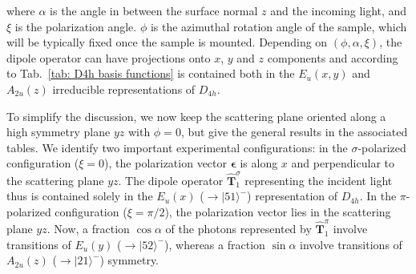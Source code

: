 \documentclass[twocolumn,prb,twocolumn,amsmath,superscriptaddress,nofootinbib,amssymb]{revtex4-1}
\newcommand{\vect}[1]{\boldsymbol{#1}}
\begin{document}
\begin{widetext}
\noindent where $\alpha$ is the angle in between the surface normal $z$ and the incoming light, and $\xi$ is the polarization angle. $\phi$ is the azimuthal rotation angle of the sample, which will be typically fixed once the sample is mounted. Depending on $(\phi,\alpha,\xi)$, the dipole operator can have projections onto $x$, $y$ and $z$ components and according to Tab.~\ref{tab: D4h basis functions} is contained both in the $E_u(x,y)$ and $A_{2u}(z)$ irreducible representations of $D_{4h}$.

To simplify the discussion, we now keep the scattering plane oriented along a high symmetry plane $yz$ with $\phi=0$, but give the general results in the associated tables. We identify two important experimental configurations:
in the $\sigma$-polarized configuration ($\xi=0$), the polarization vector $\vect{\epsilon}$ is along $x$ and perpendicular to the scattering plane $yz$. The dipole operator $\hat{\vect{T}}_1^\sigma$ representing the incident light thus is contained solely in the $E_u(x)$ ($\rightarrow|51\rangle^-$) representation of $D_{4h}$. In the $\pi$-polarized configuration ($\xi=\pi/2$), the polarization vector lies in the scattering plane $yz$. Now, a fraction $\cos \alpha$ of the photons represented by $\hat{\vect{T}}_1^\pi$ involve transitions of $E_u(y)$ ($\rightarrow|52\rangle^-$), whereas a fraction $\sin \alpha$ involve transitions of $A_{2u}(z)$ ($\rightarrow|21\rangle^-$) symmetry.



\begin{table*}[htbp]
\end{table*}
\end{widetext}
\end{document}
